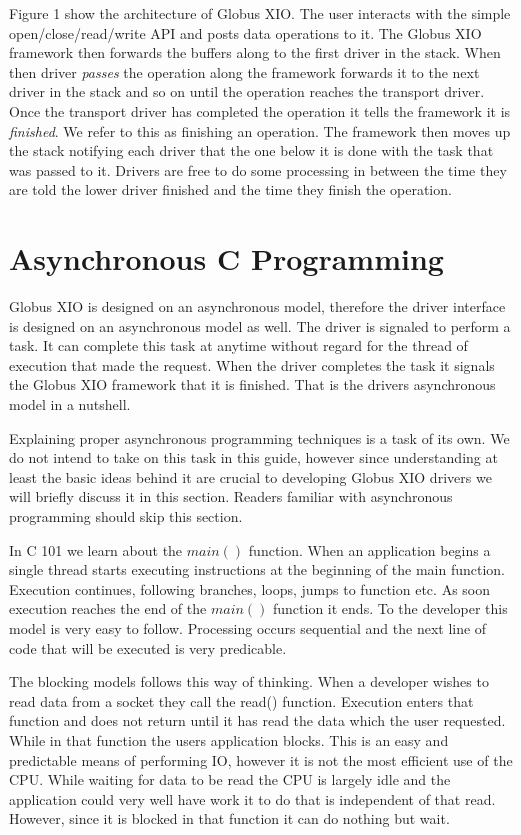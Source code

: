\documentclass[11pt]{article}
\begin{document}
Figure 1 show the architecture of Globus XIO.  The user interacts with 
the simple open/close/read/write API and posts data operations to it.
The Globus XIO framework then forwards the buffers along to the first
driver in the stack.  When then driver \emph{passes} the operation along
the framework forwards it to the next driver in the stack and so on
until the operation reaches the transport driver.  Once the transport 
driver has completed the operation it tells the framework it is 
\emph{finished}.  We refer to this as finishing an operation.  The 
framework then moves up the stack notifying each driver that the 
one below it is done with the task that was passed to it.  Drivers
are free to do some processing in between the time they are told
the lower driver finished and the time they finish the operation.

\section{Asynchronous C Programming}
Globus XIO is designed on an asynchronous model, therefore
the driver interface is designed on an asynchronous model as well.
The driver is signaled to perform a task.  It can complete this
task at anytime without regard for the thread of execution that
made the request.  When the driver completes the task it signals
the Globus XIO framework that it is finished.  That is the drivers 
asynchronous model in a nutshell.  

Explaining
proper asynchronous programming techniques is a task of its own.  We
do not intend to take on this task in this guide, however since 
understanding at least the basic ideas behind it are crucial to 
developing Globus XIO drivers we will briefly discuss it in this section.
Readers familiar with asynchronous programming should skip this section.

In C 101 we learn about the $main()$ function.  When an application 
begins a single thread starts executing instructions at the beginning
of the main function.  Execution continues, following branches, loops,
jumps to function etc.  As soon execution reaches the end of the $main()$
function it ends.  To the developer this model is very easy to follow.
Processing occurs sequential and the next line of code that will be executed
is very predicable.

The blocking models follows this way of thinking.  When a developer wishes
to read data from a socket they call the read() function.  Execution 
enters that function and does not return until it has read the data which
the user requested.  While in that function the users application 
blocks.  This is an easy and predictable means of performing IO, however
it is not the most efficient use of the CPU.  While waiting for data
to be read the CPU is largely idle and the application could very well
have work it to do that is independent of that read.  However, since
it is blocked in that function it can do nothing but wait.
\end{document}
